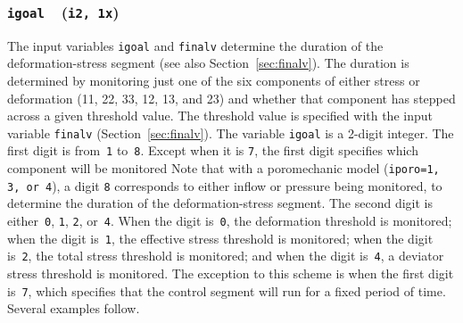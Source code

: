 \documentclass[letterpaper,11pt]{article}
\newcommand{\Var}[2]{\texttt{#1}\ \  (\texttt{#2})}
\begin{document}
\subsubsection[\texttt{igoal}]{\Var{igoal}{i2, 1x}}\label{sec:igoal}
The input variables \texttt{igoal} and \texttt{finalv} determine the
duration of the deforma\-tion-stress segment
(see also Section~\ref{sec:finalv}).
The duration is determined by monitoring just one of the six components
of either stress or deformation (\textrm{11}, \textrm{22}, 
\textrm{33}, \textrm{12},
\textrm{13}, and \textrm{23}) and whether that component has stepped across
a given threshold value.
The threshold value is specified with the input variable \texttt{finalv}
(Section~\ref{sec:finalv}).
The variable \texttt{igoal} is a 2-digit integer.
The first digit is from~\texttt{1} to~\texttt{8}.
Except when it is \texttt{7}, 
the first digit specifies which component will be monitored
Note that with a poromechanic model (\texttt{iporo=1, 3, or 4}),
a digit \texttt{8} corresponds to either inflow or pressure
being monitored, to determine the duration of the
deformation-stress segment.
The second digit is either~\texttt{0}, \texttt{1}, 
\texttt{2}, or~\texttt{4}.
When the digit is~\texttt{0}, the deformation threshold is monitored;
when the digit is~\texttt{1},
the effective stress threshold is monitored;
when the digit is~\texttt{2},
the total stress threshold is monitored;
and when the digit is~\texttt{4},
a deviator stress threshold is monitored.
The exception to this scheme is when the first digit is~\texttt{7},
which specifies that the control segment will run for a fixed period
of time.
Several examples follow.
\end{document}

